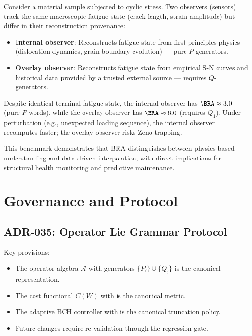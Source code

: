 \documentclass[12pt]{article}
\theoremstyle{plain}
\theoremstyle{definition}
\theoremstyle{remark}
\begin{document}

Consider a material sample subjected to cyclic stress. Two observers (sensors) track the same macroscopic fatigue state (crack length, strain amplitude) but differ in their reconstruction provenance:

\begin{itemize}
    \item \textbf{Internal observer}: Reconstructs fatigue state from first-principles physics (dislocation dynamics, grain boundary evolution) — pure $P$-generators.
    \item \textbf{Overlay observer}: Reconstructs fatigue state from empirical S-N curves and historical data provided by a trusted external source — requires $Q$-generators.
\end{itemize}

Despite identical terminal fatigue state, the internal observer has $\BRA \approx 3.0$ (pure $P$-words), while the overlay observer has $\BRA \approx 6.0$ (requires $Q_1$). Under perturbation (e.g., unexpected loading sequence), the internal observer recomputes faster; the overlay observer risks Zeno trapping.

This benchmark demonstrates that BRA distinguishes between physics-based understanding and data-driven interpolation, with direct implications for structural health monitoring and predictive maintenance.

\section{Governance and Protocol}

\subsection{ADR-035: Operator Lie Grammar Protocol}


Key provisions:
\begin{itemize}
    \item The operator algebra $\mathcal{A}$ with generators $\{P_i\} \cup \{Q_j\}$ is the canonical representation.
    \item The cost functional $C(W)$ with  is the canonical metric.
    \item The adaptive BCH controller with  is the canonical truncation policy.
    \item Future changes require re-validation through the regression gate.
\end{itemize}
\end{document}
